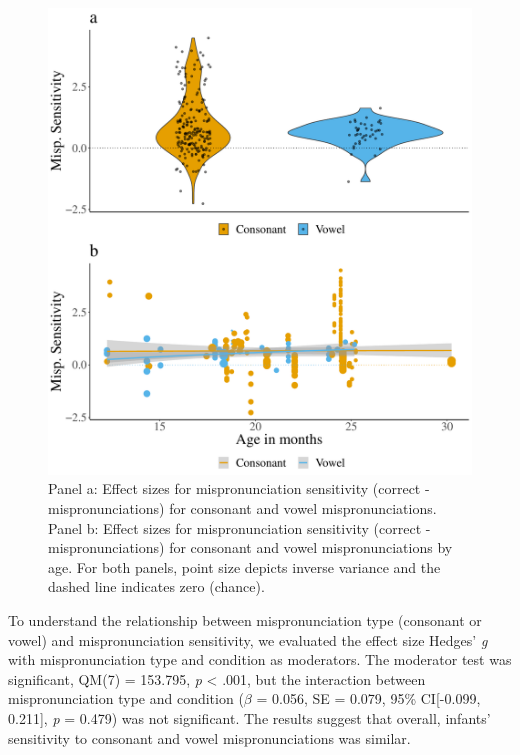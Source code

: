 \documentclass[man]{apa6}
\begin{document}
\begin{figure}
\centering
\includegraphics{VonHolzenBergmann_MPMetaAnalysis_files/figure-latex/PlotMispType-1.pdf}
\caption{\label{fig:PlotMispType}Panel a: Effect sizes for mispronunciation sensitivity (correct - mispronunciations) for consonant and vowel mispronunciations. Panel b: Effect sizes for mispronunciation sensitivity (correct - mispronunciations) for consonant and vowel mispronunciations by age. For both panels, point size depicts inverse variance and the dashed line indicates zero (chance).}
\end{figure}

To understand the relationship between mispronunciation type (consonant or vowel) and mispronunciation sensitivity, we evaluated the effect size Hedges' \emph{g} with mispronunciation type and condition as moderators. The moderator test was significant, QM(7) = 153.795, \emph{p} \textless{} .001, but the interaction between mispronunciation type and condition (\(\beta\) = 0.056, SE = 0.079, 95\% CI{[}-0.099, 0.211{]}, \emph{p} = 0.479) was not significant. The results suggest that overall, infants' sensitivity to consonant and vowel mispronunciations was similar.
\end{document}
